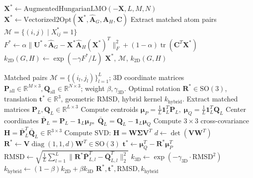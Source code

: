 \documentclass[conference]{IEEEtran}
\begin{document}
\begin{algorithm}[t]
\begin{algorithmic}[1]
    \ENDFOR
\ENDFOR
\STATE $\mathbf{X}^* \leftarrow \text{AugmentedHungarianLMO}(-\mathbf{X}, L, M, N)$
\STATE $\mathbf{X}^* \leftarrow \text{Vectorized2Opt}(\mathbf{X}^*, \hat{\mathbf{A}}_G, \hat{\mathbf{A}}_H, \mathbf{C})$ 
\STATE Extract matched atom pairs $\mathcal{M} = \{(i, j) \mid X^*_{ij} = 1\}$
\STATE $F^* \leftarrow \alpha \|\mathbf{U}^* \circ \hat{\mathbf{A}}_G - \mathbf{X}^*\hat{\mathbf{A}}_H(\mathbf{X}^*)^T\|_F^2 + (1 - \alpha)\operatorname{tr}(\mathbf{C}^T\mathbf{X}^*)$
\STATE $k_{2\text{D}}(G, H) \leftarrow \exp(-\gamma F^* / L)$ 
\RETURN $\mathbf{X}^*$, $\mathcal{M}$, $k_{2\text{D}}(G, H)$
\end{algorithmic}
\end{algorithm}

\begin{algorithm}[t]
\caption{Phase 2 Closed-Form 3D Kabsch Superposition}
\label{alg:kabsch}
\begin{algorithmic}[1]
\REQUIRE Matched pairs $\mathcal{M} = \{(i_l, j_l)\}_{l=1}^L$; 3D coordinate matrices $\mathbf{P}_{\text{all}} \in \mathbb{R}^{M \times 3}, \mathbf{Q}_{\text{all}} \in \mathbb{R}^{N \times 3}$; weight $\beta, \gamma_{\text{3D}}$.
\ENSURE Optimal rotation $\mathbf{R}^* \in \mathrm{SO}(3)$, translation $\mathbf{t}^* \in \mathbb{R}^3$, geometric RMSD, hybrid kernel $k_{\text{hybrid}}$.
\STATE Extract matched matrices $\mathbf{P}_L, \mathbf{Q}_L \in \mathbb{R}^{L \times 3}$
\STATE Compute centroids $\boldsymbol{\mu}_P = \frac{1}{L}\mathbf{1}_L^T\mathbf{P}_L, \; \boldsymbol{\mu}_Q = \frac{1}{L}\mathbf{1}_L^T\mathbf{Q}_L$
\STATE Center coordinates $\bar{\mathbf{P}}_L = \mathbf{P}_L - \mathbf{1}_L\boldsymbol{\mu}_P, \; \bar{\mathbf{Q}}_L = \mathbf{Q}_L - \mathbf{1}_L\boldsymbol{\mu}_Q$
\STATE Compute $3 \times 3$ cross-covariance $\mathbf{H} = \bar{\mathbf{P}}_L^T \bar{\mathbf{Q}}_L \in \mathbb{R}^{3 \times 3}$ 
\STATE Compute SVD: $\mathbf{H} = \mathbf{W}\mathbf{\Sigma}\mathbf{V}^T$ 
\STATE $d \leftarrow \det(\mathbf{V}\mathbf{W}^T)$ 
\STATE $\mathbf{R}^* \leftarrow \mathbf{V} \operatorname{diag}(1, 1, d) \mathbf{W}^T \in \mathrm{SO}(3)$ 
\STATE $\mathbf{t}^* \leftarrow \boldsymbol{\mu}_Q^T - \mathbf{R}^*\boldsymbol{\mu}_P^T$ 
\STATE $\text{RMSD} \leftarrow \sqrt{\frac{1}{L}\sum_{l=1}^L \|\mathbf{R}^* \bar{\mathbf{P}}_{L, l}^T - \bar{\mathbf{Q}}_{L, l}^T\|_2^2}$
\STATE $k_{\text{3D}} \leftarrow \exp(-\gamma_{\text{3D}} \cdot \text{RMSD}^2)$
\STATE $k_{\text{hybrid}} \leftarrow (1 - \beta) k_{2\text{D}} + \beta k_{\text{3D}}$
\RETURN $\mathbf{R}^*, \mathbf{t}^*, \text{RMSD}, k_{\text{hybrid}}$
\end{algorithmic}
\end{algorithm}
\end{document}
